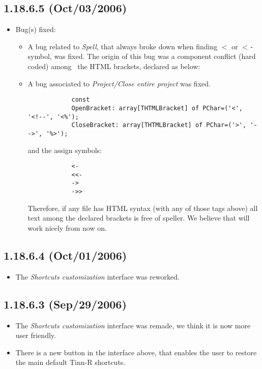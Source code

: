\subsection*{1.18.6.5 (Oct/03/2006)}
\begin{itemize}
  \item Bug(s) fixed:
    \begin{itemize}
      \item A bug related to \textit{Spell}, that always broke down when
        finding \texttt{$<$} or \texttt{$<$-} symbol, was fixed. The
        origin of this bug was a component conflict (hard coded) among \
        the HTML brackets, declared as below:
      \item A bug associated to \textit{Project/Close entire project} was fixed.

        \begin{footnotesize}
          \begin{verbatim}
            const
            OpenBracket: array[THTMLBracket] of PChar=('<', '<!--', '<%');
            CloseBracket: array[THTMLBracket] of PChar=('>', '-->', '%>');
          \end{verbatim}
        \end{footnotesize}

        and the \RR{} assign symbols:

        \begin{footnotesize}
          \begin{verbatim}
            <-
            <<-
            ->
            ->>
          \end{verbatim}
        \end{footnotesize}

        Therefore, if any file has HTML syntax (with any of those tags above) all
        text among the declared brackets is free of speller. We believe that will
        work nicely from now on.
    \end{itemize}
\end{itemize}


\subsection*{1.18.6.4 (Oct/01/2006)}
\begin{itemize}
  \item The \textit{Shortcuts customization} interface was reworked.
\end{itemize}


\subsection*{1.18.6.3 (Sep/29/2006)}
\begin{itemize}
  \item The \textit{Shortcuts customization} interface was remade, we
    think it is now more user friendly.
  \item There is a new button in the interface above, that enables the
    user to restore the main default Tinn-R shortcuts.
\end{itemize}


